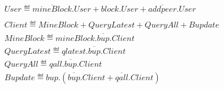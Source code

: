 \begin{align*}
    &User \eqdef \overline{mineBlock}.User + block.User + \overline{addpeer}.User \\\\
    &Client \eqdef MineBlock + QueryLatest + QueryAll + Bupdate \\%
    &MineBlock \eqdef mineBlock.\overline{bup}.Client\\
    &QueryLatest \eqdef qlatest.\overline{bup}.Client\\
    &QueryAll \eqdef qall.\overline{bup}.Client\\
    &Bupdate \eqdef bup.(\overline{bup}.Client + \overline{qall}.Client)\\
\end{align*}
